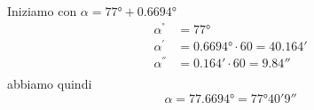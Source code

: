 	Iniziamo con
	$\alpha=\ang{77}+\ang{0.6694}$
	\begin{align*}
	\alpha^{\si{\degree}}&=\ang{77}\\
	\alpha^{\si{\arcminute}}&=\ang{0.6694}\cdot 60=\ang{;40.164;}\\
	\alpha^{\si{\arcsecond}}&=\ang{;0.164;}\cdot 60=\ang{;;9.84}\\
	\end{align*}
	abbiamo quindi
	\[\alpha=\ang{77.6694}=\ang{77;40;9}\]
